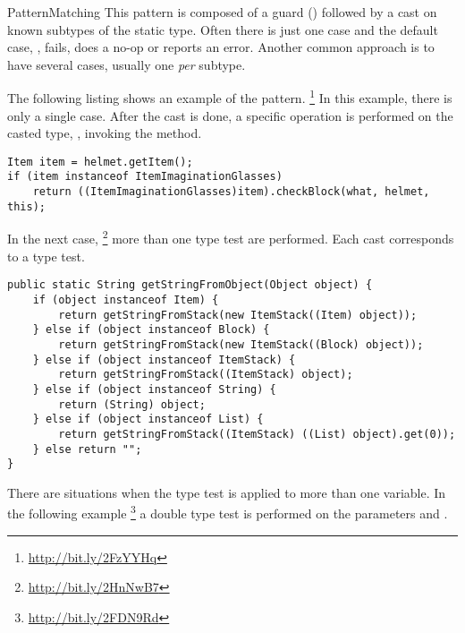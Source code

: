 \begin{pattern}{PatternMatching}
This pattern is composed of a guard () followed by a cast on known subtypes of the static type.
Often there is just one case and the default case, \ie,  fails, does a no-op or reports an error.
Another common approach is to have several cases,
usually one \emph{per} subtype.

\instances{}
The following listing shows an example of the \thisp{} pattern.%
\footnote{\url{http://bit.ly/2FzYYHq}}
In this example, there is only a single case.
After the cast is done, a specific operation is performed on the casted type, \ie, invoking the  method.

\begin{verbatim}
Item item = helmet.getItem();
if (item instanceof ItemImaginationGlasses)
	return ((ItemImaginationGlasses)item).checkBlock(what, helmet, this);
\end{verbatim}

In the next case,%
\footnote{\url{http://bit.ly/2HnNwB7}}
more than one type test are performed.
Each cast corresponds to a type test.

\begin{verbatim}
public static String getStringFromObject(Object object) {
	if (object instanceof Item) {
		return getStringFromStack(new ItemStack((Item) object));
	} else if (object instanceof Block) {
		return getStringFromStack(new ItemStack((Block) object));
	} else if (object instanceof ItemStack) {
		return getStringFromStack((ItemStack) object);
	} else if (object instanceof String) {
		return (String) object;
	} else if (object instanceof List) {
		return getStringFromStack((ItemStack) ((List) object).get(0));
	} else return "";
}
\end{verbatim}

There are situations when the type test is applied to more than one variable.
In the following example%
\footnote{\url{http://bit.ly/2FDN9Rd}}
a double type test is performed on the parameters  and .


\end{pattern}
